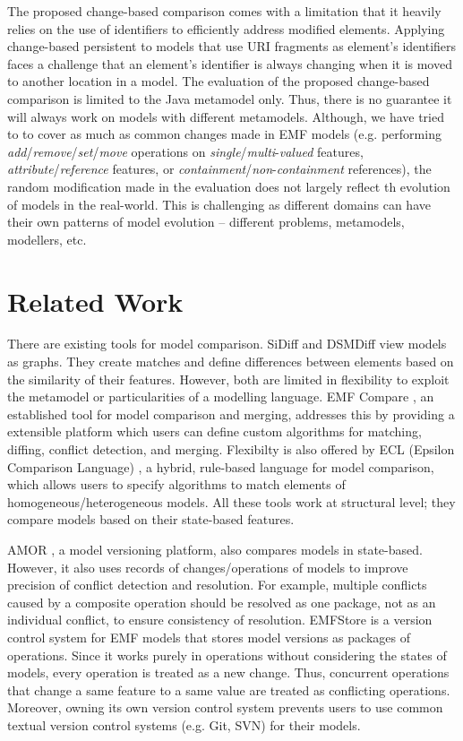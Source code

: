 \documentclass{llncs}
\begin{document}
The proposed change-based comparison comes with a limitation that it heavily relies on the use of identifiers to efficiently address modified elements. Applying change-based persistent to models that use URI fragments as element's identifiers faces a challenge that an element's identifier is always changing when it is moved to another location in a model. The evaluation of the proposed change-based comparison is limited to the Java metamodel only. Thus, there is no guarantee it will always work on models with different metamodels. Although, we have tried to to cover as much as common changes made in EMF models (e.g. performing \textit{add}/\textit{remove}/\textit{set}/\textit{move} operations on \textit{single}/\textit{multi}-\textit{valued} features, \textit{attribute}/\textit{reference} features, or \textit{containment}/\textit{non}-\textit{containment} references), the random modification made in the evaluation does not largely reflect th evolution of models in the real-world. This is challenging as different domains can have their own patterns of model evolution -- different problems, metamodels, modellers, etc.

\section{Related Work}
\label{sec:related_work}
There are existing tools for model comparison. SiDiff \cite{Treude2007SiDiff} and DSMDiff \cite{lin2009dsmdiff} view models as graphs. They create matches and define differences between elements based on the similarity of their features. However, both are limited in flexibility to exploit the metamodel or particularities of a modelling language. EMF Compare \cite{emfcompare2018developer}, an established tool for model comparison and merging, addresses this by providing a extensible platform which users can define custom algorithms for matching, diffing, conflict detection, and merging. Flexibilty is also offered by ECL (Epsilon Comparison Language) \cite{kolovos2009ecl}, a hybrid, rule-based language for model comparison, which allows users to specify algorithms to match elements of homogeneous/heterogeneous models. All these tools work at structural level; they compare models based on their state-based features.

AMOR \cite{DBLP:conf/sfm/BroschKLSWW12}, a model versioning platform, also compares models in state-based. However, it also uses records of changes/operations of models to improve precision of conflict detection and resolution. For example, multiple conflicts caused by a composite operation should be resolved as one package, not as an individual conflict, to ensure consistency of resolution. EMFStore \cite{koegel2010emfstore} is a version control system for EMF models that stores model versions as packages of operations. Since it works purely in operations without considering the states of models, every operation is treated as a new change. Thus, concurrent operations that change a same feature to a same value are treated as conflicting operations. Moreover, owning its own version control system prevents users to use common textual version control systems (e.g. Git, SVN) for their models.  
\end{document}
